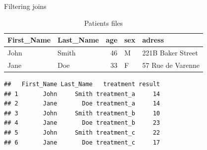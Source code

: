 \documentclass[14pt,ignorenonframetext,]{bredelebeamer}
\newenvironment{Shaded}{\begin{snugshade}}{\end{snugshade}}
\newcommand{\KeywordTok}[1]{\textcolor[rgb]{0.94,0.87,0.69}{#1}}
\newcommand{\DataTypeTok}[1]{\textcolor[rgb]{0.87,0.87,0.75}{#1}}
\newcommand{\DecValTok}[1]{\textcolor[rgb]{0.86,0.86,0.80}{#1}}
\newcommand{\StringTok}[1]{\textcolor[rgb]{0.80,0.58,0.58}{#1}}
\newcommand{\OperatorTok}[1]{\textcolor[rgb]{0.94,0.94,0.82}{#1}}
\newcommand{\NormalTok}[1]{\textcolor[rgb]{0.80,0.80,0.80}{#1}}
\begin{document}
\begin{frame}[fragile]{Filtering joins}

\begin{table}[t]

\caption{\label{tab:unnamed-chunk-55}Patients files}
\centering
\begin{tabular}{llrll}
\toprule
First\_Name & Last\_Name & age & sex & adress\\
\midrule
\rowcolor{gray!6}  John & Smith & 46 & M & 221B Baker Street\\
Jane & Doe & 33 & F & 57 Rue de Varenne\\
\bottomrule
\end{tabular}
\end{table}

\begin{Shaded}
\end{Shaded}

\begin{verbatim}
##   First_Name Last_Name   treatment result
## 1       John     Smith treatment_a     14
## 2       Jane       Doe treatment_a     14
## 3       John     Smith treatment_b     10
## 4       Jane       Doe treatment_b     23
## 5       John     Smith treatment_c     22
## 6       Jane       Doe treatment_c     17
\end{verbatim}

\end{frame}
\end{document}
